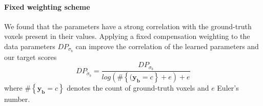     \paragraph{\textbf{Fixed weighting scheme}}
        \label{sec:fixed_weighting}
        We found that the parameters have a strong correlation with the ground-truth voxels present in their values. Applying a fixed compensation weighting to the data parameters \(DP_{\sigma_b}\) can improve the correlation of the learned parameters and our target scores
        \begin{equation}
            \label{eq:fixed_weighting}
            DP_{\tilde\sigma_b} = \frac{DP_{\sigma_b}}{log\left(\#\left\{(\mathbf{y_b} = c\right\}+e\right)+e}
        \end{equation}
        where \(\#\left\{\mathbf{y_b} = c\right\}\) denotes the count of ground-truth voxels and \(e\) Euler's number.

